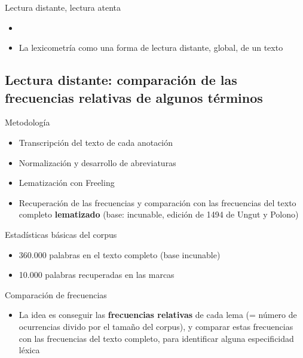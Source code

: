 \documentclass[11pt,aspectratio=169]{beamer}
\begin{document}
\begin{frame}{Lectura distante, lectura atenta}
\begin{center}
\begin{itemize}
\item {}
\item La lexicometría como una forma de lectura distante, global, de un texto
\end{itemize}
\end{center}
\end{frame}



\subsection{Lectura distante: comparación de las frecuencias relativas de algunos términos}


\begin{frame}{Metodología}
\begin{center}
\begin{itemize}
\item Transcripción del texto de cada anotación
\item Normalización y desarrollo de abreviaturas
\item Lematización con Freeling
\item Recuperación de las frecuencias y comparación con las frecuencias del texto completo \textbf{lematizado} (base: incunable, edición de 1494 de Ungut y Polono)
\end{itemize}
\end{center}
\end{frame}


\begin{frame}{Estadísticas básicas del corpus}
\begin{center}
\begin{itemize}
\item 360.000 palabras en el texto completo (base incunable)
\item 10.000 palabras recuperadas en las marcas
\end{itemize}
\end{center}
\end{frame}


\begin{frame}{Comparación de frecuencias}
\begin{center}
\begin{itemize}
\item La idea es conseguir las \textbf{frecuencias relativas} de cada lema (= número de ocurrencias divido por el tamaño del corpus), y comparar estas frecuencias con las frecuencias del texto completo, para identificar alguna especificidad léxica
\end{itemize}
\end{center}
\end{frame}
\end{document}
